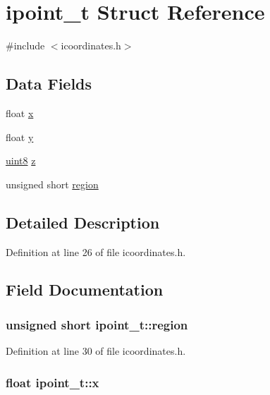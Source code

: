 \hypertarget{structipoint__t}{\section{ipoint\-\_\-t Struct Reference}
\label{structipoint__t}
}


{\ttfamily \#include $<$icoordinates.\-h$>$}

\subsection*{Data Fields}
\begin{DoxyCompactItemize}
\item 
float \hyperlink{structipoint__t_a345608e139b0709cc281139e3ed6328d}{x}
\item 
float \hyperlink{structipoint__t_a88ca543f1508de060b4738cfebb51b04}{y}
\item 
\hyperlink{itypes_8h_adde6aaee8457bee49c2a92621fe22b79}{uint8} \hyperlink{structipoint__t_ad1680bc07190dabf544e86824b82e44b}{z}
\item 
unsigned short \hyperlink{structipoint__t_a92092dc10d022e8cbeea97795e16f55b}{region}
\end{DoxyCompactItemize}


\subsection{Detailed Description}


Definition at line 26 of file icoordinates.\-h.



\subsection{Field Documentation}
\hypertarget{structipoint__t_a92092dc10d022e8cbeea97795e16f55b}{
\subsubsection[{region}]{\setlength{\rightskip}{0pt plus 5cm}unsigned short ipoint\-\_\-t\-::region}}\label{structipoint__t_a92092dc10d022e8cbeea97795e16f55b}


Definition at line 30 of file icoordinates.\-h.

\hypertarget{structipoint__t_a345608e139b0709cc281139e3ed6328d}{
\subsubsection[{x}]{\setlength{\rightskip}{0pt plus 5cm}float ipoint\-\_\-t\-::x}}\label{structipoint__t_a345608e139b0709cc281139e3ed6328d}


